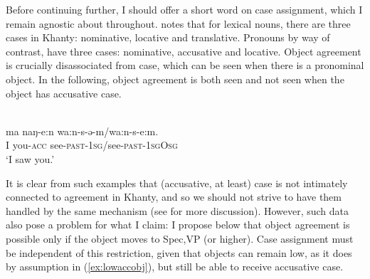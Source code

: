 \documentclass[output=paper
,modfonts
,nonflat]{langsci/langscibook}
\begin{document}
\begin{exe}
\ex \label{ex:khantyfp}
\end{exe}

\noindent Before continuing further, I should offer a short word on case assignment, which I remain agnostic about throughout.
\citet{ostyakgrammar} notes that for lexical nouns, there are three cases in Khanty: nominative, locative and translative.
Pronouns by way of contrast, have three cases: nominative, accusative and locative.
Object agreement is crucially disassociated from case, which can be seen when there is a pronominal object.
In the following, object agreement is both seen and not seen when the object has accusative case.

\begin{exe}
  \ex \citet[][65]{ostyakgrammar}\\
    \gll ma naŋ-e:n wa:n-s-ə-m/wa:n-s-e:m.\\
    I you-\textsc{acc} see-\textsc{past-1sg}/see-\textsc{past-1sgOsg}\\
    \glt `I saw you.' \hfill  \label{ex:lowaccobj}
\end{exe}

\noindent It is clear from such examples that (accusative, at least) case is not intimately connected to agreement in Khanty, and so we should not strive to have them handled by the same mechanism (see \citealt[][ch. 5]{baker2008} for more discussion).
However, such data also pose a problem for what I claim: I propose below that object agreement is possible only if the object moves to Spec,VP (or higher).
Case assignment must be independent of this restriction, given that objects can remain low, as it does by assumption in (\ref{ex:lowaccobj}), but still be able to receive accusative case.
\end{document}
